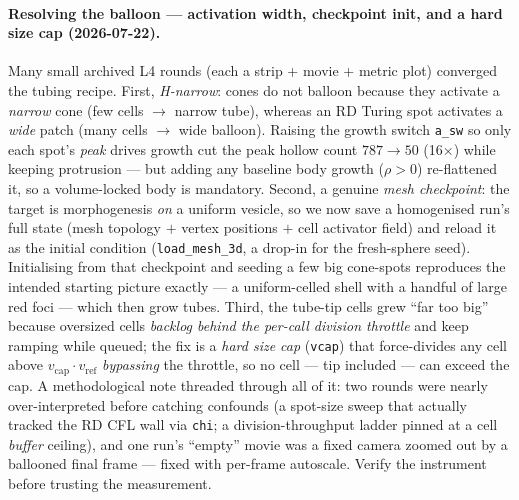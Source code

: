 \documentclass[11pt]{article}
\begin{document}
\paragraph{Resolving the balloon --- activation width, checkpoint init, and a hard size cap (2026-07-22).}
Many small archived L4 rounds (each a strip + movie + metric plot) converged the tubing recipe. First,
\emph{H-narrow}: cones do not balloon because they activate a \emph{narrow} cone (few cells $\to$ narrow
tube), whereas an RD Turing spot activates a \emph{wide} patch (many cells $\to$ wide balloon). Raising the
growth switch \texttt{a\_sw} so only each spot's \emph{peak} drives growth cut the peak hollow count
$787\!\to\!50$ (16$\times$) while keeping protrusion --- but adding any baseline body growth ($\rho\!>\!0$)
re-flattened it, so a volume-locked body is mandatory. Second, a genuine \emph{mesh checkpoint}: the target
is morphogenesis \emph{on} a uniform vesicle, so we now save a homogenised run's full state (mesh topology
$+$ vertex positions $+$ cell activator field) and reload it as the initial condition (\texttt{load\_mesh\_3d},
a drop-in for the fresh-sphere seed). Initialising from that checkpoint and seeding a few big cone-spots
reproduces the intended starting picture exactly --- a uniform-celled shell with a handful of large red
foci --- which then grow tubes. Third, the tube-tip cells grew ``far too big'' because oversized cells
\emph{backlog behind the per-call division throttle} and keep ramping while queued; the fix is a
\emph{hard size cap} (\texttt{vcap}) that force-divides any cell above $v_{\mathrm{cap}}\!\cdot\!v_{\mathrm{ref}}$
\emph{bypassing} the throttle, so no cell --- tip included --- can exceed the cap. A methodological note
threaded through all of it: two rounds were nearly over-interpreted before catching confounds (a spot-size
sweep that actually tracked the RD CFL wall via \texttt{chi}; a division-throughput ladder pinned at a cell
\emph{buffer} ceiling), and one run's ``empty'' movie was a fixed camera zoomed out by a ballooned final
frame --- fixed with per-frame autoscale. Verify the instrument before trusting the measurement.
\end{document}
